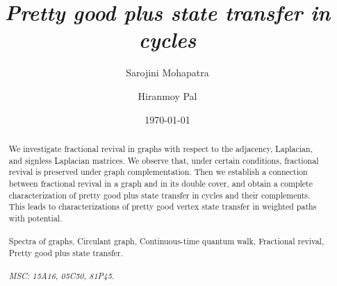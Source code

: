 \documentclass[12pt,a4paper]{article}
\title{\it Pretty good plus state transfer in cycles}
\author[1]{Sarojini Mohapatra}
\author[2]{Hiranmoy Pal}
\affil[1,2]{National Institute of Technology Rourkela, India-769008 palh@nitrkl.ac.in}
\date{\today}
\begin{document}
	
	\maketitle
	
	
	
		\begin{abstract}
        We investigate fractional revival in graphs with respect to the adjacency, Laplacian, and signless Laplacian matrices. We observe that, under certain conditions, fractional revival is preserved under graph complementation. 
       Then we establish a connection between fractional revival in a graph and in its double cover, and obtain a complete characterization of pretty good plus state transfer in cycles and their complements. This leads to characterizations of pretty good vertex state transfer in weighted paths with potential. 
\\\\
   
       Spectra of graphs, Circulant graph, Continuous-time quantum walk, Fractional revival, Pretty good plus state transfer.  
\\\\{\it MSC: 15A16, 05C50, 81P45.}
	\end{abstract}


	
	\newpage
\end{document}
